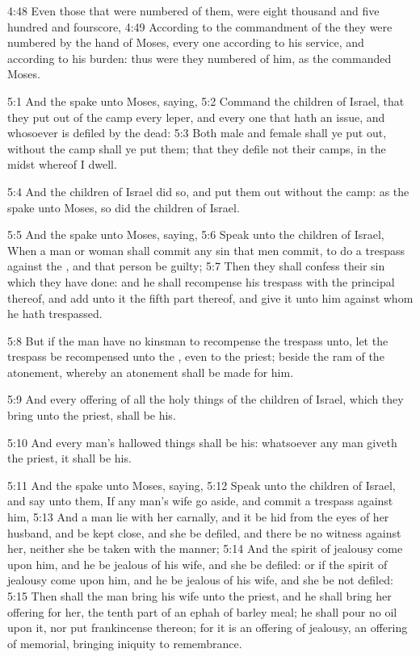 4:48 Even those that were numbered of them, were eight thousand and five hundred and fourscore, 4:49 According to the commandment of the \LORD they were numbered by the hand of Moses, every one according to his service, and according to his burden: thus were they numbered of him, as the \LORD commanded Moses.

5:1 And the \LORD spake unto Moses, saying, 5:2 Command the children of Israel, that they put out of the camp every leper, and every one that hath an issue, and whosoever is defiled by the dead: 5:3 Both male and female shall ye put out, without the camp shall ye put them; that they defile not their camps, in the midst whereof I dwell.

5:4 And the children of Israel did so, and put them out without the camp: as the \LORD spake unto Moses, so did the children of Israel.

5:5 And the \LORD spake unto Moses, saying, 5:6 Speak unto the children of Israel, When a man or woman shall commit any sin that men commit, to do a trespass against the \LORD, and that person be guilty; 5:7 Then they shall confess their sin which they have done: and he shall recompense his trespass with the principal thereof, and add unto it the fifth part thereof, and give it unto him against whom he hath trespassed.

5:8 But if the man have no kinsman to recompense the trespass unto, let the trespass be recompensed unto the \LORD, even to the priest; beside the ram of the atonement, whereby an atonement shall be made for him.

5:9 And every offering of all the holy things of the children of Israel, which they bring unto the priest, shall be his.

5:10 And every man's hallowed things shall be his: whatsoever any man giveth the priest, it shall be his.

5:11 And the \LORD spake unto Moses, saying, 5:12 Speak unto the children of Israel, and say unto them, If any man's wife go aside, and commit a trespass against him, 5:13 And a man lie with her carnally, and it be hid from the eyes of her husband, and be kept close, and she be defiled, and there be no witness against her, neither she be taken with the manner; 5:14 And the spirit of jealousy come upon him, and he be jealous of his wife, and she be defiled: or if the spirit of jealousy come upon him, and he be jealous of his wife, and she be not defiled: 5:15 Then shall the man bring his wife unto the priest, and he shall bring her offering for her, the tenth part of an ephah of barley meal; he shall pour no oil upon it, nor put frankincense thereon; for it is an offering of jealousy, an offering of memorial, bringing iniquity to remembrance.

